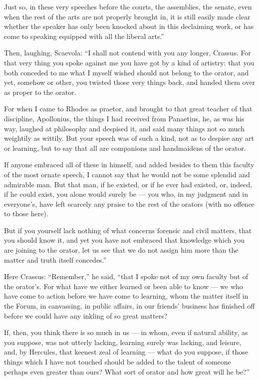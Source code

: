 Just so, in these very speeches before the courts, the assemblies, the senate, even when the rest of the arts are not properly brought in, it is still easily made clear whether the speaker has only been knocked about in this declaiming work, or has come to speaking equipped with all the liberal arts.''

 Then, laughing, Scaevola: ``I shall not contend with you any longer, Crassus. For that very thing you spoke against me you have got by a kind of artistry: that you both conceded to me what I myself wished should not belong to the orator, and yet, somehow or other, you twisted those very things back, and handed them over as proper to the orator.

 For when I came to Rhodes as praetor, and brought to that great teacher of that discipline, Apollonius, the things I had received from Panaetius, he, as was his way, laughed at philosophy and despised it, and said many things not so much weightily as wittily. But your speech was of such a kind, not as to despise any art or learning, but to say that all are companions and handmaidens of the orator.

 If anyone embraced all of these in himself, and added besides to them this faculty of the most ornate speech, I cannot say that he would not be some splendid and admirable man. But that man, if he existed, or if he ever had existed, or, indeed, if he could exist, you alone would surely be — you who, in my judgment and in everyone's, have left scarcely any praise to the rest of the orators (with no offence to those here).

 But if you yourself lack nothing of what concerns forensic and civil matters, that you should know it, and yet you have not embraced that knowledge which you are joining to the orator, let us see that we do not assign him more than the matter and truth itself concedes.''

 Here Crassus: ``Remember,'' he said, ``that I spoke not of my own faculty but of the orator's. For what have we either learned or been able to know — we who have come to action before we have come to learning, whom the matter itself in the Forum, in canvassing, in public affairs, in our friends' business has finished off before we could have any inkling of so great matters?

 If, then, you think there is so much in us — in whom, even if natural ability, as you suppose, was not utterly lacking, learning surely was lacking, and leisure, and, by Hercules, that keenest zeal of learning — what do you suppose, if those things which I have not touched should be added to the talent of someone perhaps even greater than ours? What sort of orator and how great will he be?''

